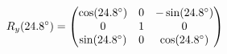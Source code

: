 \documentclass[preview]{standalone}
\begin{document}
\begin{align*}
\special{dvisvgm:raw <g id='unique000'>}R_y(24.8^\circ) = \begin{pmatrix} \cos(24.8^\circ) & 0 & -\sin(24.8^\circ) \\ 0 & 1 & 0 \\ \sin(24.8^\circ) & 0 & \cos(24.8^\circ) \end{pmatrix}\special{dvisvgm:raw </g>}
\end{align*}
\end{document}
